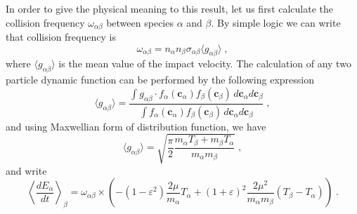 \documentclass[preprint, aps, pra]{revtex4-1}
\newcommand{\ab}{{\alpha\beta}}
\newcommand{\eps}{\varepsilon}
\newcommand{\bc}{{\bm{c}}}
\begin{document}
In order to give the physical meaning to this result, let us first calculate the collision frequency $\omega_\ab$ between species $\alpha$
and $\beta$. By simple logic we can write that collision frequency is
\begin{equation}
  \omega_\ab = n_\alpha n_\beta\sigma_\ab\langle g_\ab\rangle\;,
\end{equation}
where $\langle g_\ab\rangle$ is the mean value of the impact velocity. The calculation of any two particle dynamic function can be performed
by the following expression
\begin{equation}
  \langle g_\ab\rangle=\frac{\int g_\ab\cdot f_\alpha(\bc_\alpha)f_\beta(\bc_\beta)\,d\bc_\alpha d\bc_\beta}
  {\int f_\alpha(\bc_\alpha)f_\beta(\bc_\beta)\,d\bc_\alpha d\bc_\beta}\;,
\end{equation}
and using Maxwellian form of distribution function, we have 
\begin{equation}
  \langle g_\ab\rangle=\sqrt{\frac{\pi}{2}\frac{m_\alpha T_\beta+m_\beta T_\alpha}{m_\alpha m_\beta}}\;,
\end{equation}
and write 
\begin{equation}
  \left\langle\frac{dE_\alpha}{dt}\right\rangle_\beta = \omega_\ab\times\left(-(1-\eps^2)\frac{2\mu}{m_\alpha}T_\alpha+
  (1+\eps)^2\frac{2\mu^2}{m_\alpha m_\beta}(T_\beta-T_\alpha)\right)\;.
\end{equation}
\end{document}

